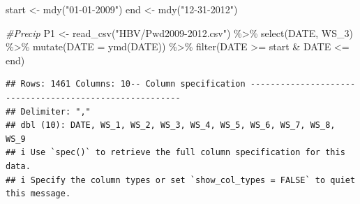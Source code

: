 \documentclass[
]{book}
\newenvironment{Shaded}{\begin{snugshade}}{\end{snugshade}}
\newcommand{\AttributeTok}[1]{\textcolor[rgb]{0.77,0.63,0.00}{#1}}
\newcommand{\CommentTok}[1]{\textcolor[rgb]{0.56,0.35,0.01}{\textit{#1}}}
\newcommand{\FunctionTok}[1]{\textcolor[rgb]{0.00,0.00,0.00}{#1}}
\newcommand{\NormalTok}[1]{#1}
\newcommand{\OtherTok}[1]{\textcolor[rgb]{0.56,0.35,0.01}{#1}}
\newcommand{\SpecialCharTok}[1]{\textcolor[rgb]{0.00,0.00,0.00}{#1}}
\newcommand{\StringTok}[1]{\textcolor[rgb]{0.31,0.60,0.02}{#1}}
\begin{document}
\begin{Shaded}
\begin{Highlighting}[]
\NormalTok{start }\OtherTok{\textless{}{-}} \FunctionTok{mdy}\NormalTok{(}\StringTok{"01{-}01{-}2009"}\NormalTok{)}
\NormalTok{end }\OtherTok{\textless{}{-}} \FunctionTok{mdy}\NormalTok{(}\StringTok{"12{-}31{-}2012"}\NormalTok{)}

\CommentTok{\#Precip}
\NormalTok{P1 }\OtherTok{\textless{}{-}} \FunctionTok{read\_csv}\NormalTok{(}\StringTok{"HBV/Pwd2009{-}2012.csv"}\NormalTok{) }\SpecialCharTok{\%\textgreater{}\%} 
         \FunctionTok{select}\NormalTok{(DATE, WS\_3) }\SpecialCharTok{\%\textgreater{}\%}
         \FunctionTok{mutate}\NormalTok{(}\AttributeTok{DATE =} \FunctionTok{ymd}\NormalTok{(DATE)) }\SpecialCharTok{\%\textgreater{}\%}
         \FunctionTok{filter}\NormalTok{(DATE }\SpecialCharTok{\textgreater{}=}\NormalTok{ start }\SpecialCharTok{\&}\NormalTok{ DATE }\SpecialCharTok{\textless{}=}\NormalTok{ end)}
\end{Highlighting}
\end{Shaded}

\begin{verbatim}
## Rows: 1461 Columns: 10-- Column specification --------------------------------------------------------
## Delimiter: ","
## dbl (10): DATE, WS_1, WS_2, WS_3, WS_4, WS_5, WS_6, WS_7, WS_8, WS_9
## i Use `spec()` to retrieve the full column specification for this data.
## i Specify the column types or set `show_col_types = FALSE` to quiet this message.
\end{verbatim}

\begin{Shaded}
\end{Shaded}
\end{document}
